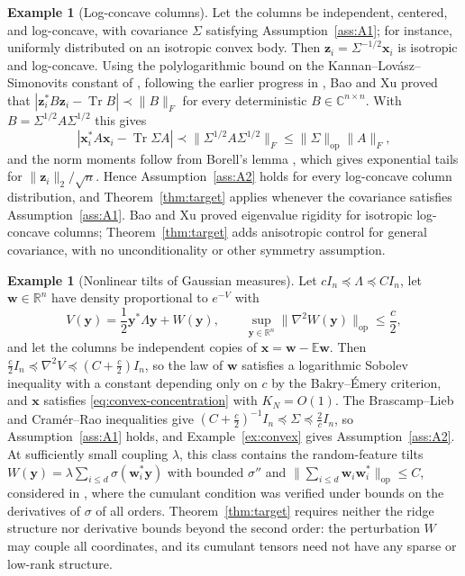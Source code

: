 \documentclass[11pt,reqno]{amsart}
\def\R{\mathbb{R}}
\def\x{\mathbf{x}}
\def\y{\mathbf{y}}
\def\z{\mathbf{z}}
\def\w{\mathbf{w}}
\def\C{\mathbb{C}}
\def\E{\mathbb{E}}
\def\op{\mathrm{op}}
\def\Tr{\operatorname{Tr}}
\def\bw{\boldsymbol{w}}
\theoremstyle{definition}
\newtheorem{example}[theorem]{Example}
\numberwithin{equation}{section}
\numberwithin{figure}{section}
\begin{document}
\begin{example}[Log-concave columns]\label{ex:logconcave}
    Let the columns be independent, centered, and log-concave, with covariance $\Sigma$ satisfying Assumption~\ref{ass:A1}; for instance, uniformly distributed on an isotropic convex body. Then $\z_i=\Sigma^{-1/2}\x_i$ is isotropic and log-concave. Using the polylogarithmic bound on the Kannan--Lov\'asz--Simonovits constant of \cite{klartag2022bourgain}, following the earlier progress in \cite{chen2021almost}, Bao and Xu \cite[Lemma~3.3]{bao2025extreme} proved that $|\z_i^*B\z_i-\Tr B|\prec\|B\|_F$ for every deterministic $B\in\C^{n\times n}$. With $B=\Sigma^{1/2}A\Sigma^{1/2}$ this gives
\[
 |\x_i^*A\x_i-\Tr\Sigma A|\prec\|\Sigma^{1/2}A\Sigma^{1/2}\|_F\le\|\Sigma\|_\op\|A\|_F,
\]
and the norm moments follow from Borell's lemma \cite{borell1974convex}, which gives exponential tails for $\|\z_i\|_2/\sqrt n$. Hence Assumption~\ref{ass:A2} holds for every log-concave column distribution, and Theorem~\ref{thm:target} applies whenever the covariance satisfies Assumption~\ref{ass:A1}. Bao and Xu \cite{bao2025extreme} proved eigenvalue rigidity for isotropic log-concave columns; Theorem~\ref{thm:target} adds anisotropic control for general covariance, with no unconditionality or other symmetry assumption.
\end{example}



\begin{example}[Nonlinear tilts of Gaussian measures]\label{ex:tilt}
Let $cI_n\preceq\Lambda\preceq CI_n$, let $\w\in\R^n$ have density proportional to $e^{-V}$ with
\[
 V(\y)=\frac12\y^*\Lambda\y+W(\y),\qquad \sup_{\y\in\R^n}\|\nabla^2W(\y)\|_\op\le\frac c2,
\]
and let the columns be independent copies of $\x=\w-\E\w$. Then $\frac c2I_n\preceq\nabla^2V\preceq(C+\frac c2)I_n$, so the law of $\w$ satisfies a logarithmic Sobolev inequality with a constant depending only on $c$ by the Bakry--\'Emery criterion, and $\x$ satisfies \eqref{eq:convex-concentration} with $K_N=O(1)$. The Brascamp--Lieb and Cram\'er--Rao inequalities give $(C+\frac c2)^{-1}I_n\preceq\Sigma\preceq\frac2cI_n$, so Assumption~\ref{ass:A1} holds, and Example~\ref{ex:convex} gives Assumption~\ref{ass:A2}. At sufficiently small coupling $\lambda$, this class contains the random-feature tilts $W(\y)=\lambda\sum_{i\le d}\sigma(\bw_i^*\y)$ with bounded $\sigma''$ and $\|\sum_{i\le d}\bw_i\bw_i^*\|_\op\le C$, considered in \cite[Proposition~2.18]{fan2026anisotropic}, where the cumulant condition was verified under bounds on the derivatives of $\sigma$ of all orders. Theorem~\ref{thm:target} requires neither the ridge structure nor derivative bounds beyond the second order: the perturbation $W$ may couple all coordinates, and its cumulant tensors need not have any sparse or low-rank structure.
\end{example}
\end{document}

